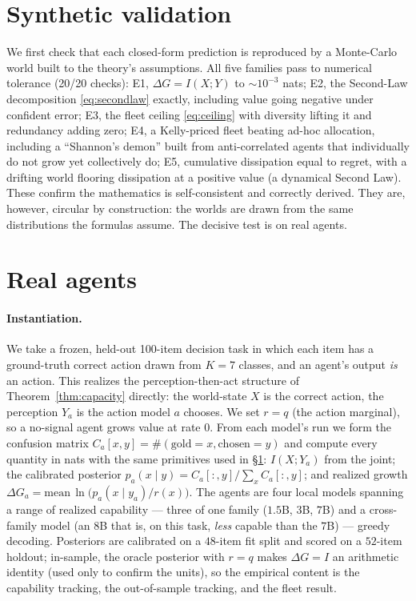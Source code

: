 \documentclass[11pt]{article}
\theoremstyle{plain}
\theoremstyle{definition}
\theoremstyle{remark}
\newcommand{\I}{I}
\begin{document}
\section{Synthetic validation}\label{sec:sim}

We first check that each closed-form prediction is reproduced by a Monte-Carlo world built to the theory's
assumptions. All five families pass to numerical tolerance (20/20 checks): E1, $\Delta G=\I(X;Y)$ to
$\sim\!10^{-3}$ nats; E2, the Second-Law decomposition \eqref{eq:secondlaw} exactly, including value going
negative under confident error; E3, the fleet ceiling \eqref{eq:ceiling} with diversity lifting it and
redundancy adding zero; E4, a Kelly-priced fleet beating ad-hoc allocation, including a ``Shannon's demon''
built from anti-correlated agents that individually do not grow yet collectively do; E5, cumulative dissipation
equal to regret, with a drifting world flooring dissipation at a positive value (a dynamical Second Law). These
confirm the mathematics is self-consistent and correctly derived. They are, however, circular by construction:
the worlds are drawn from the same distributions the formulas assume. The decisive test is on real agents.

\section{Real agents}\label{sec:real}

\paragraph{Instantiation.} We take a frozen, held-out 100-item decision task in which each item has a
ground-truth correct action drawn from $K=7$ classes, and an agent's output \emph{is} an action. This realizes
the perception-then-act structure of Theorem~\ref{thm:capacity} directly: the world-state $X$ is the correct
action, the perception $Y_a$ is the action model $a$ chooses. We set $r=q$ (the action marginal), so a
no-signal agent grows value at rate $0$. From each model's run we form the confusion matrix
$C_a[x,y]=\#(\text{gold}=x,\text{chosen}=y)$ and compute every quantity in nats with the same primitives used in
\S\ref{sec:sim}: $\I(X;Y_a)$ from the joint; the calibrated posterior $p_a(x\mid y)=C_a[:,y]/\sum_x C_a[:,y]$;
and realized growth $\Delta G_a=\text{mean}\,\ln\!\big(p_a(x\mid y_a)/r(x)\big)$. The agents are four local
models spanning a range of realized capability --- three of one family ($1.5$B, $3$B, $7$B) and a cross-family
model (an $8$B that is, on this task, \emph{less} capable than the $7$B) --- greedy decoding. Posteriors are
calibrated on a $48$-item fit split and scored on a $52$-item holdout; in-sample, the oracle posterior with
$r=q$ makes $\Delta G=\I$ an arithmetic identity (used only to confirm the units), so the empirical content is
the capability tracking, the out-of-sample tracking, and the fleet result.
\end{document}
